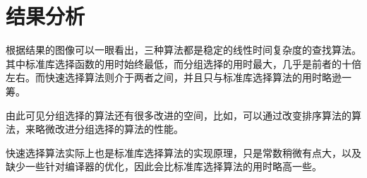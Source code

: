 \section{结果分析}

根据结果的图像可以一眼看出，三种算法都是稳定的线性时间复杂度的查找算法。其中标准库选择函数的用时始终最低，而分组选择的用时最大，几乎是前者的十倍左右。而快速选择算法则介于两者之间，并且只与标准库选择算法的用时略逊一筹。

由此可见分组选择的算法还有很多改进的空间，比如，可以通过改变排序算法的算法，来略微改进分组选择的算法的性能。

快速选择算法实际上也是标准库选择算法的实现原理，只是常数稍微有点大，以及缺少一些针对编译器的优化，因此会比标准库选择算法的用时略高一些。
